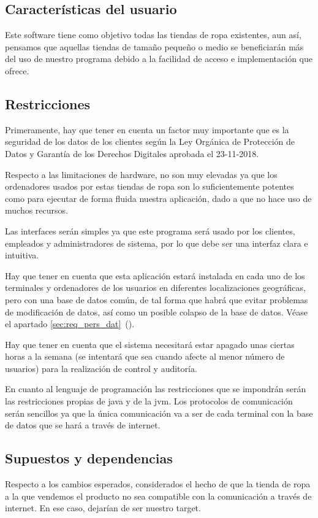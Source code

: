 \subsection{Características del usuario}
Este software tiene como objetivo todas las tiendas de ropa existentes, aun así, pensamos
que aquellas tiendas de tamaño pequeño o medio se beneficiarán más del uso de
nuestro programa debido a la facilidad de acceso e implementación que ofrece.
\subsection{Restricciones}
Primeramente, hay que tener en cuenta un factor muy importante que es la seguridad
de los datos de los clientes según la Ley Orgánica de Protección de Datos y Garantía de
los Derechos Digitales aprobada el 23-11-2018.

Respecto a las limitaciones de hardware, no son muy elevadas ya que los ordenadores
usados por estas tiendas de ropa son lo suficientemente potentes como para ejecutar de forma fluida nuestra
aplicación, dado a que no hace uso de muchos recursos.

Las interfaces serán simples ya que este programa será usado por los clientes, empleados y
administradores de sistema, por lo que debe ser una interfaz clara e intuitiva.

Hay que tener en cuenta que esta aplicación estará instalada en cada uno de los
terminales y ordenadores de los usuarios en diferentes localizaciones geográficas, pero
con una base de datos común, de tal forma que habrá que evitar problemas de
modificación de datos, así como un posible colapso de la base de datos. Véase el apartado \ref{sec:req_pers_dat}~().

Hay que tener en cuenta que el sistema necesitará estar apagado unas ciertas horas a
la semana (se intentará que sea cuando afecte al menor número de usuarios) para la
realización de control y auditoría.

En cuanto al lenguaje de programación las restricciones que se impondrán serán las restricciones propias de java y de la \gls{jvm}.
Los protocolos de comunicación serán sencillos ya que la única comunicación va a ser
de cada terminal con la base de datos que se hará a través de internet.



\subsection{Supuestos y dependencias}
Respecto a los cambios esperados, considerados el hecho de que la tienda de ropa a
la que vendemos el producto no sea compatible con la comunicación a través de
internet. En ese caso, dejarían de ser nuestro target.

